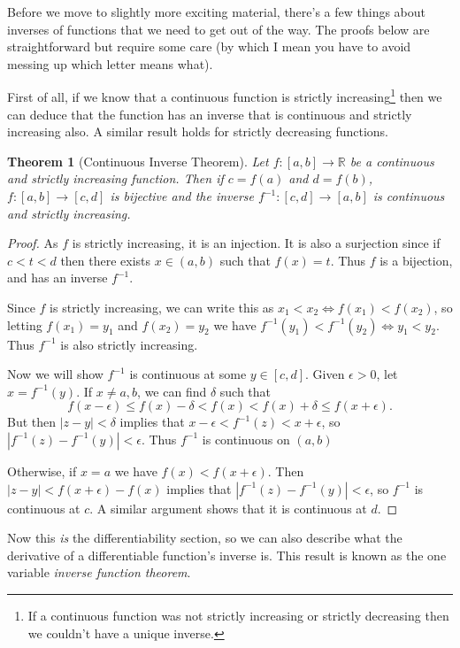 \documentclass[11pt, a4paper]{article}
\newtheorem{theorem}{Theorem}[section]
\theoremstyle{definition}
\newcommand{\R}{\mathbb{R}}
\begin{document}
Before we move to slightly more exciting material, there's a few things about inverses of functions that we need to get out of the way. The proofs below are straightforward but require some care (by which I mean you have to avoid messing up which letter means what).

First of all, if we know that a continuous function is strictly increasing\footnote{If a continuous function was not strictly increasing or strictly decreasing then we couldn't have a unique inverse.} then we can deduce that the function has an inverse that is continuous and strictly increasing also. A similar result holds for strictly decreasing functions.

\begin{theorem}[Continuous Inverse Theorem]
	Let $f:[a, b] \rightarrow \R$ be a continuous and strictly increasing function. Then if $c = f(a)$ and $d = f(b)$, $f:[a, b] \rightarrow [c, d]$ is bijective and the inverse $f^{-1}: [c, d] \rightarrow [a, b]$ is continuous and strictly increasing.
\end{theorem}
\begin{proof}
	As $f$ is strictly increasing, it is an injection. It is also a surjection since if $c < t < d$ then there exists $x \in (a, b)$ such that $f(x) = t$. Thus $f$ is a bijection, and has an inverse $f^{-1}$.

	Since $f$ is strictly increasing, we can write this as $x_1 < x_2 \iff f(x_1) < f(x_2)$, so letting $f(x_1) = y_1$ and $f(x_2) = y_2$ we have 
	$f^{-1}(y_1) < f^{-1}(y_2) \iff y_1 < y_2$. Thus $f^{-1}$ is also strictly increasing.
	
	Now we will show $f^{-1}$ is continuous at some $y \in [c, d]$.
	Given $\epsilon > 0$, 
	let $x = f^{-1}(y)$. If $x \neq a, b$, we can find $\delta$ such that
	$$
		f(x - \epsilon) \leq f(x) - \delta < f(x) < f(x) + \delta \leq f(x + \epsilon).
	$$
	But then $|z - y| < \delta$ implies that $x - \epsilon < f^{-1}(z) < x + \epsilon$, so $|f^{-1}(z) - f^{-1}(y)| < \epsilon$.
	Thus $f^{-1}$ is continuous on $(a, b)$

	Otherwise, if $x = a$ we have $f(x) < f(x + \epsilon)$. Then $|z - y| < f(x + \epsilon) - f(x)$ implies that $|f^{-1}(z) - f^{-1}(y)| < \epsilon$, so $f^{-1}$ is continuous at $c$. A similar argument shows that it is continuous at $d$.
\end{proof}

Now this \emph{is} the differentiability section, so we can also describe what the derivative of a differentiable function's inverse is. This result is known as the one variable \emph{inverse function theorem}.
\end{document}

